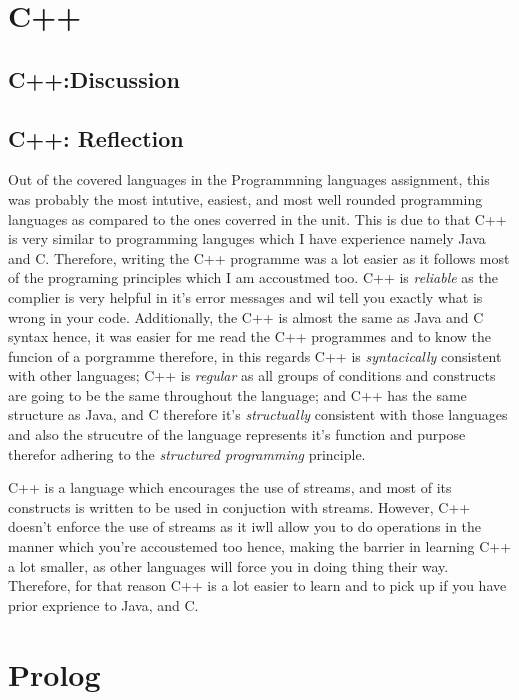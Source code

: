 \documentclass[
	12pt, %
]{fphw}
\begin{document}
\section{C++}

\subsection{C++:Discussion}

\subsection{C++: Reflection}
Out of the covered languages in the Programmning languages assignment, this was
probably the most intutive, easiest, and most well rounded programming languages as
compared to the ones coverred in the unit. This is due to that C++ is very similar
to programming languges which I have experience namely Java and C. Therefore,
writing the C++ programme was a lot easier as it follows most of the programing
principles which I am accoustmed too. C++ is \emph{reliable} as the complier is
very helpful in it's error messages and wil tell you exactly what is wrong in
your code. Additionally, the C++ is almost the same as Java and C syntax hence,
it was easier for me read the C++ programmes and to know the funcion of a
porgramme therefore, in this regards C++ is \emph{syntacically} consistent with
other languages; C++ is \emph{regular} as all groups of conditions and constructs
are going to be the same throughout the language; and C++ has the same structure
as Java, and C therefore it's \emph{structually} consistent with those languages
and also the strucutre of the language represents it's function and purpose therefor
adhering to the \emph{structured programming} principle.\par

C++ is a language which encourages the use of streams, and most of its constructs
is written to be used in conjuction with streams. However, C++ doesn't enforce
the use of streams as it iwll allow you to do operations in the manner which you're
accoustemed too hence, making the barrier in learning C++ a lot smaller, as other
languages will force you in doing thing their way. Therefore, for that reason
C++ is a lot easier to learn and to pick up if you have prior exprience to Java,
and C.

\section{Prolog}
\end{document}
